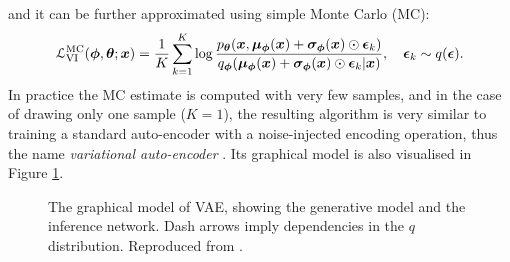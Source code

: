and it can be further approximated using simple Monte Carlo (MC):
\begin{equation}
\mathcal{L}^{\text{MC}}_{\text{VI}}(\bm{\phi}, \bm{\theta}; \bm{x}) = \frac{1}{K} \sum_{k=1}^K  \log \frac{p_{\bm{\theta}}(\bm{x}, \bm{\mu}_{\bm{\phi}}(\bm{x}) + \bm{\sigma}_{\bm{\phi}}(\bm{x}) \odot \bm{\epsilon}_k)}{q_{\bm{\phi}}(\bm{\mu}_{\bm{\phi}}(\bm{x}) + \bm{\sigma}_{\bm{\phi}}(\bm{x}) \odot \bm{\epsilon}_k  |\bm{x})}, \quad \bm{\epsilon}_k \sim q(\bm{\epsilon}).
\label{eq:chap2_vae_objective_mc}
\end{equation}
%
In practice the MC estimate is computed with very few samples, and in the case of drawing only one sample ($K=1$), the resulting algorithm is very similar to training a standard auto-encoder with a noise-injected encoding operation, thus the name \emph{variational auto-encoder} \citep{kingma:vae2014, rezende:vae2014}. Its graphical model is also visualised in Figure \ref{fig:vae_figure}.

\begin{figure}[t]
\begin{center}
\end{center}
\caption{
The graphical model of VAE, showing the generative model and the inference network. Dash arrows imply dependencies in the $q$ distribution. Reproduced from \cite{kingma:vae2014}.
}
\label{fig:vae_figure}
\end{figure}

